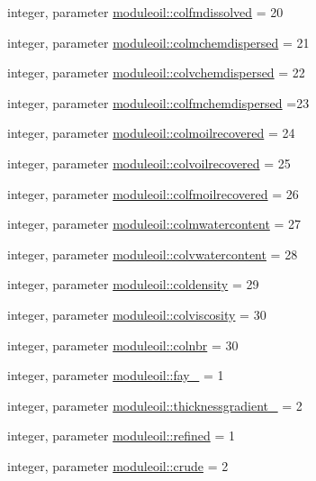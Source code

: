 \begin{DoxyCompactItemize}
integer, parameter \mbox{\hyperlink{namespacemoduleoil_aca711e07505004093d7f821a746a5e0e}{moduleoil\+::colfmdissolved}} = 20
\item 
integer, parameter \mbox{\hyperlink{namespacemoduleoil_a4a4c0c64d30f57fba354d9e4cc938720}{moduleoil\+::colmchemdispersed}} = 21
\item 
integer, parameter \mbox{\hyperlink{namespacemoduleoil_a8e8fb4b278c65dccdc8d9f1800b6bd2d}{moduleoil\+::colvchemdispersed}} = 22
\item 
integer, parameter \mbox{\hyperlink{namespacemoduleoil_a9bb0cdf66e197c1f1085b7005475fa28}{moduleoil\+::colfmchemdispersed}} =23
\item 
integer, parameter \mbox{\hyperlink{namespacemoduleoil_a037325aef7bc894d7a245eaff634677f}{moduleoil\+::colmoilrecovered}} = 24
\item 
integer, parameter \mbox{\hyperlink{namespacemoduleoil_a50de48619d92d9d816b55ef4169e63be}{moduleoil\+::colvoilrecovered}} = 25
\item 
integer, parameter \mbox{\hyperlink{namespacemoduleoil_a3d323118340637b27ba2f0d81a08b14b}{moduleoil\+::colfmoilrecovered}} = 26
\item 
integer, parameter \mbox{\hyperlink{namespacemoduleoil_aef12293605401def345b9d9648095e37}{moduleoil\+::colmwatercontent}} = 27
\item 
integer, parameter \mbox{\hyperlink{namespacemoduleoil_a24f3e477cedecbea5dbebf0029597e9a}{moduleoil\+::colvwatercontent}} = 28
\item 
integer, parameter \mbox{\hyperlink{namespacemoduleoil_a5a4aff8481aa609e74b890613af52e7a}{moduleoil\+::coldensity}} = 29
\item 
integer, parameter \mbox{\hyperlink{namespacemoduleoil_a0c2df7caf6e999192a0b444702e943fe}{moduleoil\+::colviscosity}} = 30
\item 
integer, parameter \mbox{\hyperlink{namespacemoduleoil_a30c511c7fa2c51a98b83d1388c6777c2}{moduleoil\+::colnbr}} = 30
\item 
integer, parameter \mbox{\hyperlink{namespacemoduleoil_a9bbc6e1f4a84d5cd13db1cf6c2a97b29}{moduleoil\+::fay\+\_\+}} = 1
\item 
integer, parameter \mbox{\hyperlink{namespacemoduleoil_af5497b75883cdc370714d52a6e24a73f}{moduleoil\+::thicknessgradient\+\_\+}} = 2
\item 
integer, parameter \mbox{\hyperlink{namespacemoduleoil_a9323fa2198772c36833e461c7a6af583}{moduleoil\+::refined}} = 1
\item 
integer, parameter \mbox{\hyperlink{namespacemoduleoil_a26b19843dbe29efd606aed575f35992a}{moduleoil\+::crude}} = 2

\end{DoxyCompactItemize}
